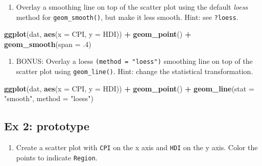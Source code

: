 \documentclass[]{book}
\newenvironment{Shaded}{\begin{snugshade}}{\end{snugshade}}
\newcommand{\KeywordTok}[1]{\textcolor[rgb]{0.13,0.29,0.53}{\textbf{#1}}}
\newcommand{\DataTypeTok}[1]{\textcolor[rgb]{0.13,0.29,0.53}{#1}}
\newcommand{\DecValTok}[1]{\textcolor[rgb]{0.00,0.00,0.81}{#1}}
\newcommand{\StringTok}[1]{\textcolor[rgb]{0.31,0.60,0.02}{#1}}
\newcommand{\OperatorTok}[1]{\textcolor[rgb]{0.81,0.36,0.00}{\textbf{#1}}}
\newcommand{\NormalTok}[1]{#1}
\providecommand{\tightlist}{%
  \setlength{\itemsep}{0pt}\setlength{\parskip}{0pt}}
\begin{document}
\begin{enumerate}
\def\labelenumi{\arabic{enumi}.}
\setcounter{enumi}{3}
\tightlist
\item
  Overlay a smoothing line on top of the scatter plot using the default
  \emph{loess} method for \texttt{geom\_smooth()}, but make it less
  smooth. Hint: see \texttt{?loess}.
\end{enumerate}

\begin{Shaded}
\begin{Highlighting}[]
\KeywordTok{ggplot}\NormalTok{(dat, }\KeywordTok{aes}\NormalTok{(}\DataTypeTok{x =}\NormalTok{ CPI, }\DataTypeTok{y =}\NormalTok{ HDI)) }\OperatorTok{+}
\StringTok{  }\KeywordTok{geom_point}\NormalTok{() }\OperatorTok{+}
\StringTok{  }\KeywordTok{geom_smooth}\NormalTok{(}\DataTypeTok{span =}\NormalTok{ .}\DecValTok{4}\NormalTok{)}
\end{Highlighting}
\end{Shaded}

\begin{enumerate}
\def\labelenumi{\arabic{enumi}.}
\setcounter{enumi}{4}
\tightlist
\item
  BONUS: Overlay a loess \texttt{(method\ =\ "loess")} smoothing line on
  top of the scatter plot using \texttt{geom\_line()}. Hint: change the
  statistical transformation.
\end{enumerate}

\begin{Shaded}
\begin{Highlighting}[]
\KeywordTok{ggplot}\NormalTok{(dat, }\KeywordTok{aes}\NormalTok{(}\DataTypeTok{x =}\NormalTok{ CPI, }\DataTypeTok{y =}\NormalTok{ HDI)) }\OperatorTok{+}
\StringTok{  }\KeywordTok{geom_point}\NormalTok{() }\OperatorTok{+}
\StringTok{  }\KeywordTok{geom_line}\NormalTok{(}\DataTypeTok{stat =} \StringTok{"smooth"}\NormalTok{, }\DataTypeTok{method =} \StringTok{"loess"}\NormalTok{)}
\end{Highlighting}
\end{Shaded}

\subsection{Ex 2: prototype}\label{ex-2-prototype-1}

\begin{enumerate}
\def\labelenumi{\arabic{enumi}.}
\tightlist
\item
  Create a scatter plot with \texttt{CPI} on the x axis and \texttt{HDI}
  on the y axis. Color the points to indicate \texttt{Region}.
\end{enumerate}
\end{document}
